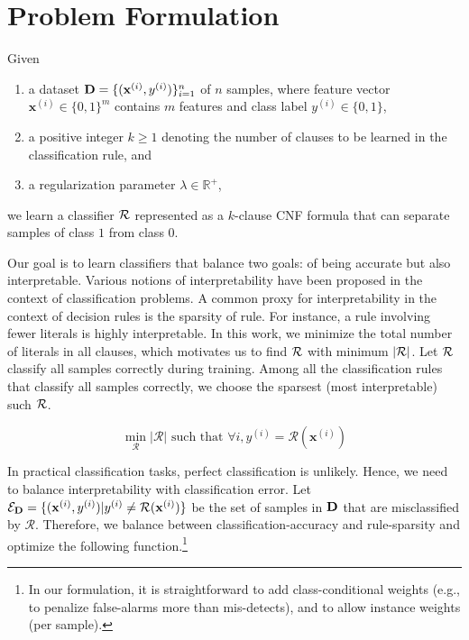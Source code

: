 

 \section{Problem Formulation}
 \label{interpretability_imli_sec:problem}
Given 
\begin{enumerate}
	\item a dataset $ \mathbf{D} = \{(\mathbf{x}^{(i)}, y^{(i)})\}_{i=1}^n$ of $ n $ samples, where feature vector $ \mathbf{x}^{(i)} \in \{0, 1\}^m $ contains $ m $ features and class label $ y^{(i)} \in \{0,1\} $,
	\item a positive integer $ k \ge 1 $ denoting the number of clauses to be learned in the classification rule, and
	\item a regularization parameter $ \lambda \in \mathbb{R}^+ $,
\end{enumerate}
we learn a classifier $ {\mathcal{R}} $ represented as a $ k $-clause CNF formula that can separate samples of class $ 1 $ from class $ 0 $. 
 
 

 Our goal is to learn classifiers that balance two 
 goals: of  being accurate but also interpretable.  
 Various notions of interpretability have been proposed in the context of   classification problems. A common proxy for interpretability in the context of decision rules 
 is the sparsity of rule. For instance, a rule involving fewer literals is highly interpretable.  In this work, we minimize the total number of literals in all clauses, which motivates us to  find $ {\mathcal{R}}  $ with minimum  $ |{\mathcal{R}}| $. Let $ {\mathcal{R}} $ classify all samples correctly during training. Among all the classification rules that classify all samples correctly,  we choose the sparsest (most interpretable) such $ {\mathcal{R}} $. 
 
 

 \[
 \min\limits_{\mathcal{R}} |\mathcal{R}|\text{ such that }\forall i, y^{(i)}=\mathcal{R}(\mathbf{x}^{(i)})
 \]

 

 In practical classification tasks, perfect classification is unlikely. Hence, we need to balance interpretability with classification error.  Let $ \mathcal{E}_{\mathbf{D}} = \{(\mathbf{x}^{(i)},y^{(i)}) | y^{(i)} \ne \mathcal{R}(\mathbf{x}^{(i)}) \} $   be  the set of samples in $ \mathbf{D} $ that are misclassified  by $ \mathcal{R} $. Therefore, we balance between classification-accuracy and rule-sparsity and optimize the following function.\footnote{In our formulation, it is  straightforward to add class-conditional weights  (e.g., to penalize  false-alarms more than mis-detects), and to allow instance weights (per sample).}

